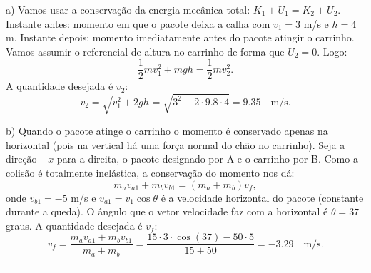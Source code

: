 \documentclass[12pt]{article}
\newenvironment{problem}[2][{\color{red}Problema}]{\begin{trivlist}
\item[\hskip \labelsep {\bfseries #1}\hskip \labelsep {\bfseries #2.}]}{\end{trivlist}}
\begin{document}
\begin{problem}{3}
a) Vamos usar a conservação da energia mecânica total: $K_1+U_1 = K_2+U_2$. Instante antes: momento em que o pacote deixa a calha com $v_1=3$ m/s e $h=4$ m. Instante depois: momento imediatamente antes do pacote atingir o carrinho. Vamos assumir o referencial de altura no carrinho de forma que $U_2=0$. Logo:
\begin{equation}
\frac{1}{2}mv_1^2 + mgh = \frac{1}{2}mv_2^2. \nonumber 
\end{equation}
A quantidade desejada é $v_2$:
{\color{red}
\begin{equation}
v_2 = \sqrt{v_1^2 + 2gh} = \sqrt{3^2 + 2\cdot 9.8 \cdot 4} = 9.35 \quad \text{m/s}. \nonumber  
\end{equation}}

\noindent
b) Quando o pacote atinge o carrinho o momento é conservado apenas na horizontal (pois na vertical há uma força normal do chão no carrinho). Seja a direção $+x$ para a direita, o pacote designado por A e o carrinho por B. Como a colisão é totalmente inelástica, a conservação do momento nos dá:
\begin{equation}
m_a v_{a1} + m_bv_{b1} = (m_a+m_b)v_f, \nonumber
\end{equation}
onde $v_{b1} = -5$ m/s e $v_{a1} = v_1 \cos \theta$ é a velocidade horizontal do pacote (constante durante a queda). O ângulo que o vetor velocidade faz com a horizontal é $\theta = 37$ graus. A quantidade desejada é $v_f$:
{\color{red}
\begin{equation}
v_f = \dfrac{m_a v_{a1} + m_bv_{b1}}{m_a+m_b} = \dfrac{15 \cdot 3 \cdot \cos (37) - 50 \cdot 5}{15+50} = -3.29 \quad \text{m/s}.  \nonumber
\end{equation}} 
 
 

\end{problem}

\begin{center}
\noindent\rule{13cm}{0.5pt}
\end{center}
\end{document}
